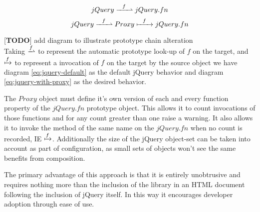 \documentclass[preprint]{sigplanconf}
\begin{document}
\begin{figure}[!ht]
\begin{equation} \label{eq:jquery-default}
 jQuery \xrightharpoonup{\ \ f\ \ } jQuery.fn
\end{equation}
\begin{equation} \label{eq:jquery-with-proxy}
 jQuery \xrightharpoonup{\ \ f\ \ } Proxy \xmapsto{\ \ f\ \ } jQuery.fn
\end{equation}
\end{figure}

[\textbf{TODO}] add diagram to illustrate prototype chain alteration
\\

Taking \begin{math}\xrightharpoonup{f}\end{math} to represent the automatic prototype look-up of \begin{math}f\end{math} on the target, and \begin{math}\xmapsto{f}\end{math} to represent a invocation of \begin{math}f\end{math} on the target by the source object we have diagram \ref{eq:jquery-default} as the default jQuery behavior and diagram \ref{eq:jquery-with-proxy} as the desired behavior.

The \begin{math}Proxy\end{math} object must define it's own version of each and every function property of the \begin{math}jQuery.fn\end{math} prototype object. This allows it to count invocations of those functions and for any count greater than one raise a warning. It also allows it to invoke the method of the same name on the \begin{math}jQuery.fn\end{math} when no count is recorded, IE \begin{math}\xmapsto{f}\end{math}. Additionally the size of the jQuery object-set can be taken into account as part of configuration, as small sets of objects won't see the same benefits from composition.

The primary advantage of this approach is that it is entirely unobtrusive and requires nothing more than the inclusion of the library in an HTML document following the inclusion of jQuery itself. In this way it encourages developer adoption through ease of use.
\end{document}
